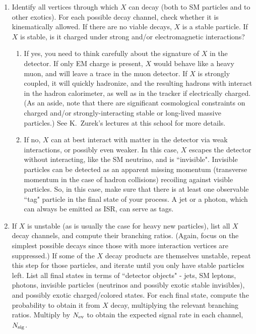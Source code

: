 \documentclass{ws-procs9x6}
\begin{document}
\begin{enumerate}
\item Identify all vertices through which $X$ can decay (both to SM particles and to other exotics). For each possible decay channel, check whether it is kinematically allowed. If there are no viable decays, $X$ is a stable particle. If $X$ is stable, is it charged under strong and/or electromagnetic interactions?

\begin{enumerate}

\item If yes, you need to think carefully about the signature of $X$ in the detector. If only EM charge is present, $X$ would behave like a heavy muon, and will leave a trace in the muon detector. If $X$ is strongly coupled, it will quickly hadronize, and the resulting hadrons with interact in the hadron calorimeter, as well as in the tracker if electrically charged. (As an aside, note that there are significant cosmological constraints on charged and/or strongly-interacting stable or long-lived massive particles.) See K.~Zurek's lectures at this school for more details. 

\item If no, $X$ can at best interact with matter in the detector via weak interactions, or possibly even weaker. In this case, $X$ escapes the detector without interacting, like the SM neutrino, and is ``invisible". Invisible particles can be detected as an apparent missing momentum (transverse momentum in the case of hadron collisions) recoiling against visible particles. So, in this case, make sure that there is at least one observable ``tag" particle in the final state of your process. A jet or a photon, which can always be emitted as ISR, can serve as tags.

\end{enumerate}

\item If $X$ is unstable (as is usually the case for heavy new particles), list all $X$ decay channels, and compute their branching ratios. (Again, focus on the simplest possible decays since those with more interaction vertices are suppressed.) If some of the $X$ decay products are themselves unstable, repeat this step for those particles, and iterate until you only have stable particles left. List all final states in terms of ``detector objects" - jets, SM leptons, photons, invisible particles (neutrinos and possibly exotic stable invisibles), and possibly exotic charged/colored states. For each final state, compute the probability to obtain it from $X$ decay, multiplying the relevant branching ratios. Multiply by $N_{\rm ev}$ to obtain the expected signal rate in each channel, $N_{\rm sig}$.


\end{enumerate}
\end{document}
